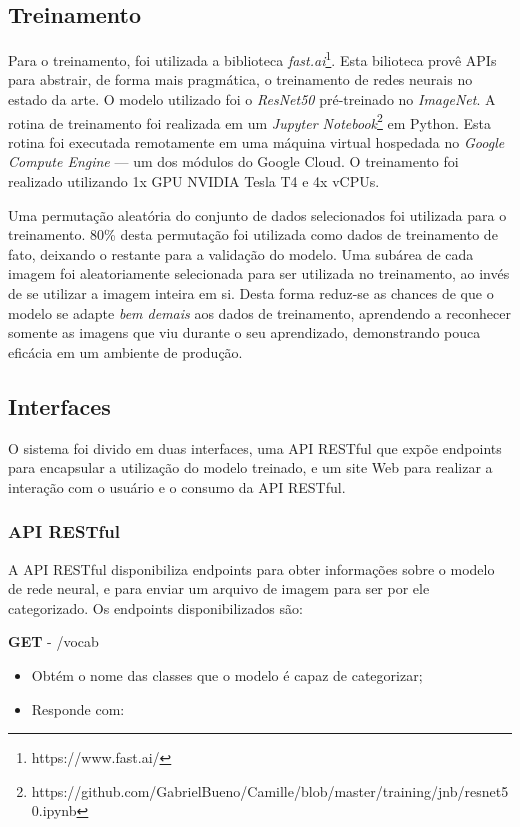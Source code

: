 \documentclass[12pt, a4paper]{article}
\begin{document}
\subsection{Treinamento}
Para o treinamento, foi utilizada a biblioteca \emph{fast.ai}\footnote{https://www.fast.ai/}. Esta bilioteca provê APIs para abstrair, de forma mais pragmática, o treinamento de redes neurais no estado da arte. O modelo utilizado foi o \emph{ResNet50} pré-treinado no \emph{ImageNet}. A rotina de treinamento foi realizada em um \emph{Jupyter Notebook}\footnote{https://github.com/GabrielBueno/Camille/blob/master/training/jnb/resnet50.ipynb} em Python. Esta rotina foi executada remotamente em uma máquina virtual hospedada no \emph{Google Compute Engine} --- um dos módulos do Google Cloud. O treinamento foi realizado utilizando 1x GPU NVIDIA Tesla T4 e 4x vCPUs.

Uma permutação aleatória do conjunto de dados selecionados foi utilizada para o treinamento. 80\% desta permutação foi utilizada como dados de treinamento de fato, deixando o restante para a validação do modelo. Uma subárea de cada imagem foi aleatoriamente selecionada para ser utilizada no treinamento, ao invés de se utilizar a imagem inteira em si. Desta forma reduz-se as chances de que o modelo se adapte \emph{bem demais} aos dados de treinamento, aprendendo a reconhecer somente as imagens que viu durante o seu aprendizado, demonstrando pouca eficácia em um ambiente de produção.

\subsection{Interfaces}
O sistema foi divido em duas interfaces, uma API RESTful que expõe endpoints para encapsular a utilização do modelo treinado, e um site Web para realizar a interação com o usuário e o consumo da API RESTful.

\subsubsection{API RESTful}
A API RESTful disponibiliza endpoints para obter informações sobre o modelo de rede neural, e para enviar um arquivo de imagem para ser por ele categorizado. Os endpoints disponibilizados são:

\bigskip
\noindent
\textbf{GET} - /vocab

\begin{itemize}
\item Obtém o nome das classes que o modelo é capaz de categorizar;
\item Responde com:
\end{itemize}
\end{document}
